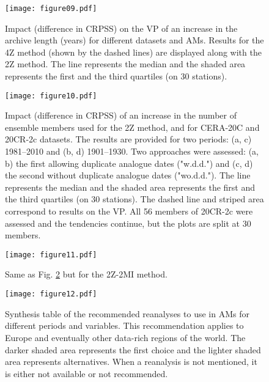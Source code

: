 \documentclass[smallextended]{svjour3}       %
\begin{document}
	\begin{figure}
		\texttt{[image: figure09.pdf]}\\
		\caption{Impact (difference in CRPSS) on the VP of an increase in the archive length (years) for different datasets and AMs. Results for the 4Z method (shown by the dashed lines) are displayed along with the 2Z method. The line represents the median and the shaded area represents the first and the third quartiles (on 30 stations).}
		\label{fig:plot_impact_length}
	\end{figure}
	
	\begin{figure}
		\texttt{[image: figure10.pdf]}\\
		\caption{Impact (difference in CRPSS) of an increase in the number of ensemble members used for the 2Z method, and for CERA-20C and 20CR-2c datasets. The results are provided for two periods: (a, c) 1981--2010 and (b, d) 1901--1930. Two approaches were assessed: (a, b) the first allowing duplicate analogue dates ("w.d.d.") and (c, d) the second without duplicate analogue dates ("wo.d.d."). The line represents the median and the shaded area represents the first and the third quartiles (on 30 stations). The dashed line and striped area correspond to results on the VP. All 56 members of 20CR-2c were assessed and the tendencies continue, but the plots are split at 30 members.}
		\label{fig:plot_impact_members_2Z}
	\end{figure}
	
	\begin{figure}
		\texttt{[image: figure11.pdf]}\\
		\caption{Same as Fig. \ref{fig:plot_impact_members_2Z} but for the 2Z-2MI method.}
		\label{fig:plot_impact_members_2Z-2MI}
	\end{figure}
	
	\begin{figure}
		\texttt{[image: figure12.pdf]}\\
		\caption{Synthesis table of the recommended reanalyses to use in AMs for different periods and variables. This recommendation applies to Europe and eventually other data-rich regions of the world. The darker shaded area represents the first choice and the lighter shaded area represents alternatives. When a reanalysis is not mentioned, it is either not available or not recommended.}
		\label{fig:synthesis-table}
	\end{figure}
	
\end{document}

